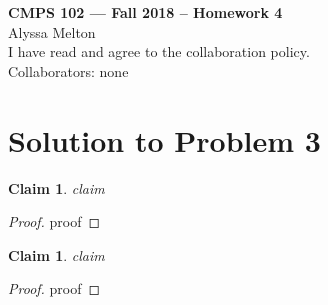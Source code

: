 \documentclass[11pt]{article}
\newtheorem{claim}[theorem]{Claim}
\begin{document}
	\begin{center}
		{\bf\Large CMPS 102 --- Fall 2018 --  Homework 4}\\
		Alyssa Melton\\
		I have read and agree to the collaboration policy. \\
		Collaborators: none\\
	\end{center}


	\section*{Solution to Problem 3}




	\begin{claim}
		claim
	\end{claim}

	\begin{proof}
		proof
	\end{proof}

	\begin{claim}
	claim
\end{claim}

\begin{proof}
	proof
\end{proof}

	\newpage
\end{document}

